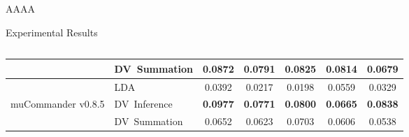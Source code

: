 \documentclass[final]{beamer} %
\begin{document}
\begin{frame}
\begin{beamercolorbox}[center]{AAAA}
\begin{minipage}[T]{.97\textwidth}
\begin{block}{Experimental Results}
\begin{columns}
\begin{column}{0.45\textwidth}
\begin{tabular}{llccccc}
            & DV\ Summation & {\bf 0.0872} & {\bf 0.0791} & {\bf 0.0825} & {\bf 0.0814} & {\bf 0.0679} \\
            \hline
            & LDA           & 0.0392       & 0.0217       & 0.0198       & 0.0559       & 0.0329       \\
            muCommander v0.8.5 & DV\ Inference & {\bf 0.0977} & {\bf 0.0771} & {\bf 0.0800} & {\bf 0.0665} & {\bf 0.0838} \\
            & DV\ Summation & 0.0652       & 0.0623       & 0.0703       & 0.0606       & 0.0538       \\
            \hline
          \end{tabular}
        \end{column}\hspace{-2cm}
        \begin{column}{0.24\textwidth}
          \centering
          \vspace{0.1mm} %

\end{column}
\end{columns}
\end{block}
\end{minipage}
\end{beamercolorbox}
\end{frame}
\end{document}
